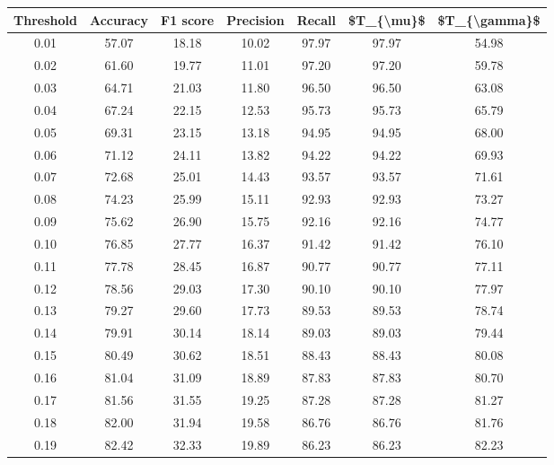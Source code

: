 \begin{tabular}{|c|c|c|c|c|c|c|}
\hline
 Threshold &  Accuracy &  F1 score &  Precision &  Recall &  \$T\_\{\textbackslash mu\}\$ &  \$T\_\{\textbackslash gamma\}\$ \\
\hline
      0.01 &     57.07 &     18.18 &      10.02 &   97.97 &      97.97 &         54.98 \\
      0.02 &     61.60 &     19.77 &      11.01 &   97.20 &      97.20 &         59.78 \\
      0.03 &     64.71 &     21.03 &      11.80 &   96.50 &      96.50 &         63.08 \\
      0.04 &     67.24 &     22.15 &      12.53 &   95.73 &      95.73 &         65.79 \\
      0.05 &     69.31 &     23.15 &      13.18 &   94.95 &      94.95 &         68.00 \\
      0.06 &     71.12 &     24.11 &      13.82 &   94.22 &      94.22 &         69.93 \\
      0.07 &     72.68 &     25.01 &      14.43 &   93.57 &      93.57 &         71.61 \\
      0.08 &     74.23 &     25.99 &      15.11 &   92.93 &      92.93 &         73.27 \\
      0.09 &     75.62 &     26.90 &      15.75 &   92.16 &      92.16 &         74.77 \\
      0.10 &     76.85 &     27.77 &      16.37 &   91.42 &      91.42 &         76.10 \\
      0.11 &     77.78 &     28.45 &      16.87 &   90.77 &      90.77 &         77.11 \\
      0.12 &     78.56 &     29.03 &      17.30 &   90.10 &      90.10 &         77.97 \\
      0.13 &     79.27 &     29.60 &      17.73 &   89.53 &      89.53 &         78.74 \\
      0.14 &     79.91 &     30.14 &      18.14 &   89.03 &      89.03 &         79.44 \\
      0.15 &     80.49 &     30.62 &      18.51 &   88.43 &      88.43 &         80.08 \\
      0.16 &     81.04 &     31.09 &      18.89 &   87.83 &      87.83 &         80.70 \\
      0.17 &     81.56 &     31.55 &      19.25 &   87.28 &      87.28 &         81.27 \\
      0.18 &     82.00 &     31.94 &      19.58 &   86.76 &      86.76 &         81.76 \\
      0.19 &     82.42 &     32.33 &      19.89 &   86.23 &      86.23 &         82.23 \\

\end{tabular}
